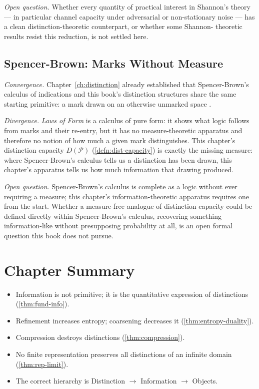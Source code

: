 \documentclass[12pt,twoside,openright]{book}
\newcommand{\partition}{\mathcal{P}}
\newenvironment{chapsummary}{%
  \begin{tcolorbox}[colback=DistBlue!5,colframe=DistBlue,
    title={\faBookOpen\enspace Summary},
    fonttitle=\sffamily\bfseries\color{white},
    attach boxed title to top left={yshift=-2mm,xshift=4mm},
    boxed title style={colback=DistBlue,rounded corners}]
  \begin{itemize}[nosep,leftmargin=*]}{%
  \end{itemize}\end{tcolorbox}}
\begin{document}
\emph{Open question.} Whether every quantity of practical
interest in Shannon's theory --- in particular channel capacity
under adversarial or non-stationary noise --- has a clean
distinction-theoretic counterpart, or whether some Shannon-
theoretic results resist this reduction, is not settled here.

\subsection*{Spencer-Brown: Marks Without Measure}

\emph{Convergence.} Chapter~\ref{ch:distinction} already
established that Spencer-Brown's calculus of indications and
this book's distinction structures share the same starting
primitive: a mark drawn on an otherwise unmarked space
\parencite{spencer-brown1969}.

\emph{Divergence.} \emph{Laws of Form} is a calculus of pure
form: it shows what logic follows from marks and their
re-entry, but it has no measure-theoretic apparatus and
therefore no notion of how much a given mark distinguishes.
This chapter's distinction capacity $D(\partition)$
(\cref{defn:dist-capacity}) is exactly the missing measure:
where Spencer-Brown's calculus tells us a distinction has been
drawn, this chapter's apparatus tells us how much information
that drawing produced.

\emph{Open question.} Spencer-Brown's calculus is complete as a
logic without ever requiring a measure; this chapter's
information-theoretic apparatus requires one from the start.
Whether a measure-free analogue of distinction capacity could
be defined directly within Spencer-Brown's calculus, recovering
something information-like without presupposing probability at
all, is an open formal question this book does not pursue.

\section*{Chapter Summary}
\begin{chapsummary}
  \item Information is not primitive; it is the
        quantitative expression of distinctions
        (\cref{thm:fund-info}).
  \item Refinement increases entropy; coarsening decreases
        it (\cref{thm:entropy-duality}).
  \item Compression destroys distinctions
        (\cref{thm:compression}).
  \item No finite representation preserves all distinctions
        of an infinite domain (\cref{thm:rep-limit}).
  \item The correct hierarchy is Distinction $\to$
        Information $\to$ Objects.
\end{chapsummary}
\end{document}
